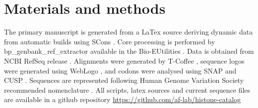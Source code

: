 \section{Materials and methods}
\label{sec:matmethods}

	The primary manuscript is generated from a LaTex source 
	deriving dynamic data from automatic builds using SCons  \citep{SCons2005}.
	Core processing is performed by bp\_genbank\_ref\_extractor
	available in the Bio-EUtilities  \citep{BioPerl2002}.
	Data is obtained from NCBI RefSeq release  \citep{PruittRefseq2014}.
	Alignments were generated by T-Coffee   \citep{tcoffee2000}, 
	sequence logos were generated using WebLogo   \citep{weblogo}, 
	and codons were analysed using SNAP  \citep{KorberSNAP2000} 
	and CUSP  \citep{Emboss2000}.
	Sequences are represented following Human Genome Variation Society recommended nomenclature \citep{mutnomenclature2003}.
	All scripts, latex sources and current sequence files 
	are available in a github repository \url{https://github.com/af-lab/histone-catalog}
